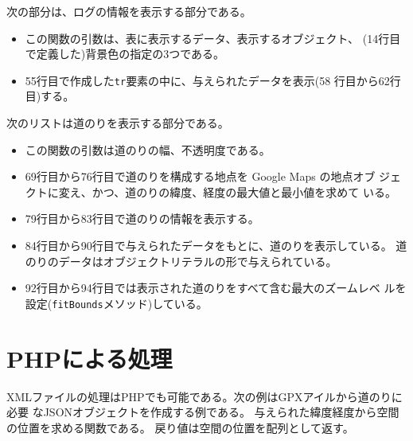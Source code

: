  次の部分は、ログの情報を表示する部分である。
 \begin{itemize}
	\item この関数の引数は、表に表示するデータ、表示するオブジェクト、
				(14行目で定義した)背景色の指定の3つである。
	\item 55行目で作成した\texttt{tr}要素の中に、与えられたデータを表示(58
				行目から62行目)する。
 \end{itemize}
 次のリストは道のりを表示する部分である。
 \begin{itemize}
	\item この関数の引数は道のりの幅、不透明度である。
	\item 69行目から76行目で道のりを構成する地点を Google Maps の地点オブ
				ジェクトに変え、かつ、道のりの緯度、経度の最大値と最小値を求めて
				いる。
	\item 79行目から83行目で道のりの情報を表示する。
	\item 84行目から90行目で与えられたデータをもとに、道のりを表示している。
				道のりのデータはオブジェクトリテラルの形で与えられている。
	\item 92行目から94行目では表示された道のりをすべて含む最大のズームレベ
				ルを設定(\texttt{fitBounds}メソッド)している。
 \end{itemize}
 \section{PHPによる処理}
 XMLファイルの処理はPHPでも可能である。次の例はGPXアイルから道のりに必要
 なJSONオブジェクトを作成する例である。
 与えられた緯度経度から空間の位置を求める関数である。
 戻り値は空間の位置を配列として返す。

